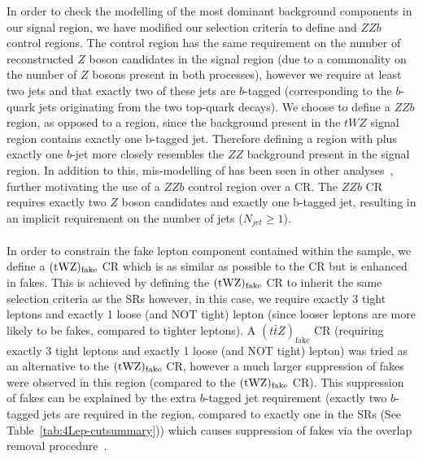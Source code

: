 In order to check the modelling of the most dominant background components in our signal region, we have modified our selection criteria to define \ttZ and $ZZb$ control regions. The \ttZ control region has the same requirement on the number of reconstructed $Z$ boson candidates in the signal region (due to a commonality on the number of $Z$ bosons present in both processes), however we require at least two jets and that exactly two of these jets are $b$-tagged (corresponding to the $b$-quark jets originating from the two top-quark decays). We choose to define a $ZZb$ region, as opposed to a \ZZ region, since the \ZZ background present in the $tWZ$ signal region contains exactly one b-tagged jet. Therefore defining a region with \ZZ plus exactly one $b$-jet more closely resembles the $ZZ$ background present in the signal region. In addition to this, mis-modelling of \ZZ has been seen in other analyses~\cite{Aaboud:2019, ppToZZ:CMSpaper}, further motivating the use of a $ZZb$ control region over a \ZZ CR. The $ZZb$ CR requires exactly two $Z$ boson candidates and exactly one b-tagged jet, resulting in an implicit requirement on the number of jets ($N_{jet} \geq 1$).\\\\

In order to constrain the fake lepton component contained within the \ttZ sample, we define a $(\tWZ)_{\text{fake}}$ CR which is as similar as possible to the \tWZ CR but is enhanced in fakes. This is achieved by defining the $(\tWZ)_{\text{fake}}$ CR to inherit the same selection criteria as the \tWZ SRs however, in this case, we require exactly 3 tight leptons and exactly 1 loose (and NOT tight) lepton (since looser leptons are more likely to be fakes, compared to tighter leptons). A $(t\bar{t}Z)_{\text{fake}}$ CR (requiring exactly 3 tight leptons and exactly 1 loose (and NOT tight) lepton) was tried as an alternative to the $(\tWZ)_{\text{fake}}$ CR, however a much larger suppression of fakes were observed in this region (compared to the $(\tWZ)_{\text{fake}}$ CR). This suppression of fakes can be explained by the extra $b$-tagged jet requirement (exactly two $b$-tagged jets are required in the \ttZ region, compared to exactly one in the \tWZ SRs (See Table~\ref{tab:4Lep-cutsummary})) which causes suppression of fakes via the overlap removal procedure~\cite{Overlap-removal-slides}.\\\\

